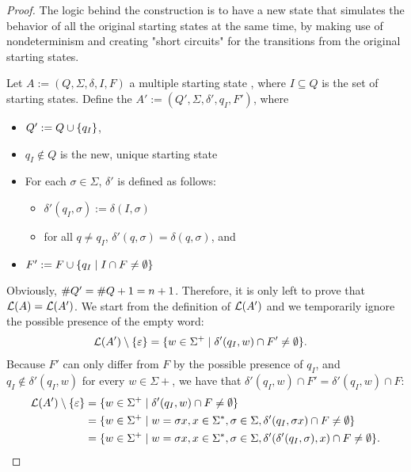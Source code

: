 \begin{proof}
	The logic behind the construction is to have a new state that simulates the behavior of all the original starting states at the same time, by making use of nondeterminism and creating "short circuits" for the transitions from the original starting states.

	Let $A:=(Q,\Sigma,\delta,I,F)$ a multiple starting state \ONFA, where $I\subseteq Q$ is the set of starting states.
	Define the \ONFA $A':=(Q',\Sigma,\delta',q_I,F')$, where
	\begin{itemize}
		\item $Q':=Q\cup\{q_I\}$,
		\item $q_I\notin Q$ is the new, unique starting state
		\item For each $\sigma\in\Sigma$, $\delta'$ is defined as follows:
		      \begin{itemize}
			      \item $\delta'(q_I,\sigma):=\delta(I,\sigma)$
			      \item for all $q\ne q_I$, $\delta'(q,\sigma)=\delta(q,\sigma)$, and
		      \end{itemize}
		\item $F':=F\cup\{q_I\mid I\cap F\ne\emptyset\}$
	\end{itemize}
	Obviously, $\# Q'=\# Q+1=n+1$. Therefore, it is only left to prove that $\mathcal L(A)=\mathcal L(A')$.
	We start from the definition of $\mathcal L(A')$ and we temporarily ignore the possible presence of the empty word:
	\begin{align*}
		\mathcal L(A')\setminus\{\varepsilon\} & = \{w\in\Sigma^+\mid \delta'(q_I,w)\cap F'\ne\emptyset\} \text.
	\end{align*}
	Because $F'$ can only differ from $F$ by the possible presence of $q_I$, and $q_I\notin\delta'(q_I,w)$ for every $w\in\Sigma\plus$, we have that $\delta'(q_I,w)\cap F'=\delta'(q_I,w)\cap F$:
	\begin{align*}
		\genlang(A')\setminus\set{\emptyword} & = \set{w\in\Sigma\plus\mid \delta'(q_I,w)\cap F\ne\emptyset}                                                                    \\
		                                      & = \set{w\in\Sigma\plus\mid w=\sigma x, x\in\Sigma\star,\sigma\in\Sigma,\delta'(q_I,\sigma x)\cap F\ne\emptyset}                 \\
		                                      & = \set{w\in\Sigma\plus\mid w=\sigma x, x\in\Sigma\star,\sigma\in\Sigma,\delta'(\delta'(q_I,\sigma),x)\cap F\ne\emptyset} \text.

\end{align*}
\end{proof}
